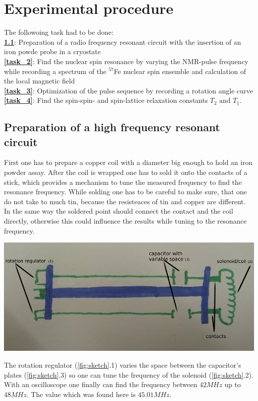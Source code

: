 \section{Experimental procedure}

    The followoing task had to be done:\\
    \textbf{\ref{task_1}}: Preparation of a radio frequency resonant circuit with the insertion of an iron powde probe in a cryostate\\
    \textbf{\ref{task_2}}: Find the nuclear spin resonance by varying the NMR-pulse frequency while recording a spectrum of the $^{57}$Fe nuclear spin ensemble and calculation of the local magnetic field\\
    \textbf{\ref{task_3}}: Optimization of the pulse sequence by recording a rotation angle curve\\
    \textbf{\ref{task_4}}: Find the spin-spin- and spin-lattice relaxation constants $T_2 \text{ and } T_1$.   

	\subsection{Preparation of a high frequency resonant circuit}
    \label{task_1}
    First one has to prepare a copper coil with a diameter big enough to hold an iron powder assay. After the coil is wrapped one has to sold it onto the contacts of a stick, which provides a mechanism to tune the measured frequency to find the resonance frequency. While solding one has to be careful to make sure, that one do not take to much tin, because the resisteaces of tin and copper are different. In the same way the soldered point should connect the contact and the coil directly, otherwise this could influence the results while tuning to the resonance frequency.
    \begin{center}
           \includegraphics[scale=0.4]{pic/Skizze_Sonde.png} 
           \label{fig:sketch}
    \end{center}
    The rotation regulator (\ref{fig:sketch}.1) varies the space between the capacitor's plates (\ref{fig:sketch}.3) so one can tune the frequency of the solenoid (\ref{fig:sketch}.2).
    With an oscilloscope one finally can find the frequency between $42\unit{MHz}$ up to $48\unit{MHz}$. The value which was found here is $45.01\unit{MHz}$.

